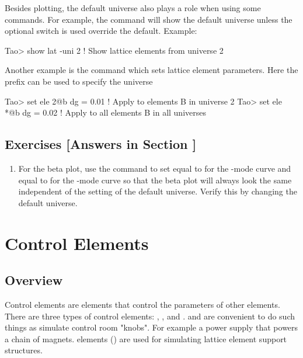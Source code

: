 \documentclass{hitec}     %
\newcommand{\Section}[1]{\section{#1}\vspace*{-1ex}}
\begin{document}
Besides plotting, the default universe also plays a role when using some \tao commands. For example,
the  command will show the default universe unless the optional  switch is
used override the default. Example:
\begin{code}
Tao> show lat -uni 2    ! Show lattice elements from universe 2
\end{code}

Another example is the  command which sets lattice element parameters. Here the  prefix
can be used to specify the universe
\begin{code}
Tao> set ele 2@b dg = 0.01   ! Apply to elements B in universe 2
Tao> set ele *@b dg = 0.02   ! Apply to all elements B in all universes
\end{code}

\subsection{Exercises [Answers in Section ]}
\label{s:multi.uni.ex}

\begin{enumerate}[label=\thesection.\arabic{enumi}]
\item
For the beta plot, use the  command to set  equal to  for the
-mode curve and  equal to  for the -mode curve so that the beta
plot will always look the same independent of the setting of the default universe. Verify this by
changing the default universe.
\end{enumerate}

\newpage

\Section{Control Elements}
\label{s:control}

\subsection{Overview}

Control elements are elements that control the parameters of other elements. There are three types
of control elements: , , and .  and
 are convenient to do such things as simulate control room "knobs". For example a power
supply that powers a chain of magnets.  elements ()
are used for simulating lattice element support structures.
\end{document}
